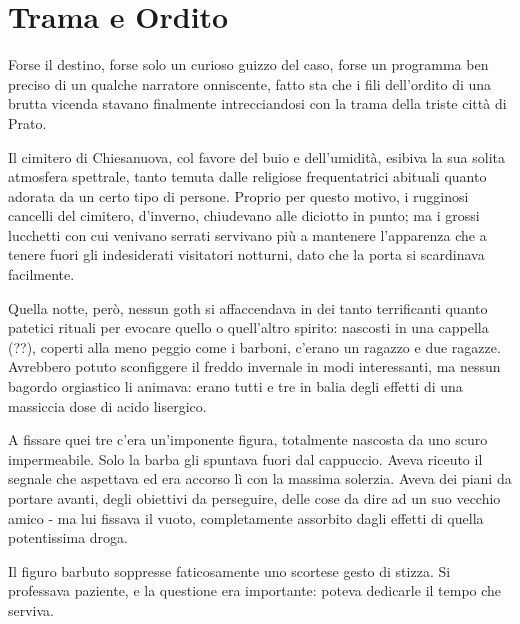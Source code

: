 \chapter{Trama e Ordito}


Forse il destino, forse solo un curioso guizzo del caso, forse un programma ben preciso di un qualche narratore onniscente, fatto sta che i fili dell'ordito di una brutta vicenda stavano finalmente intrecciandosi con la trama della triste città di Prato.

Il cimitero di Chiesanuova, col favore del buio e dell'umidità, esibiva la sua solita atmosfera spettrale, tanto temuta dalle religiose frequentatrici abituali quanto adorata da un certo tipo di persone. Proprio per questo motivo, i rugginosi cancelli del cimitero, d'inverno, chiudevano alle diciotto in punto; ma i grossi lucchetti con cui venivano serrati servivano più a mantenere l'apparenza che a tenere fuori gli indesiderati visitatori notturni, dato che la porta si scardinava facilmente.

Quella notte, però, nessun goth si affaccendava in dei tanto terrificanti quanto patetici rituali per evocare quello o quell'altro spirito: nascosti in una cappella (??), coperti alla meno peggio come i barboni, c'erano un ragazzo e due ragazze. Avrebbero potuto sconfiggere il freddo invernale in modi interessanti, ma nessun bagordo orgiastico li animava: erano tutti e tre in balia degli effetti di una massiccia dose di acido lisergico.

A fissare quei tre c'era un'imponente figura, totalmente nascosta da uno scuro impermeabile. Solo la barba gli spuntava fuori dal cappuccio. Aveva riceuto il segnale che aspettava ed era accorso lì con la massima solerzia. Aveva dei piani da portare avanti, degli obiettivi da perseguire, delle cose da dire ad un suo vecchio amico - ma lui fissava il vuoto, completamente assorbito dagli effetti di quella potentissima droga.

Il figuro barbuto soppresse faticosamente uno scortese gesto di stizza. Si professava paziente, e la questione era importante: poteva dedicarle il tempo che serviva.